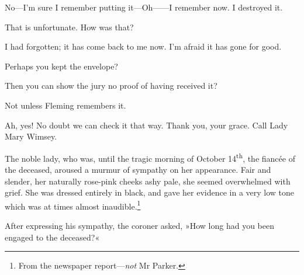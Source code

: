 \begin{dialogue}
 No—I'm sure I remember putting it—Oh——I remember now. I destroyed it.

 That is unfortunate. How was that?

 I had forgotten; it has come back to me now. I'm afraid it has gone for good.

 Perhaps you kept the envelope?

 

 Then you can show the jury no proof of having received it?

 Not unless Fleming remembers it.

 Ah, yes! No doubt we can check it that way. Thank you, your grace. Call Lady Mary Wimsey.
\end{dialogue}

The noble lady, who was, until the tragic morning of October 14\textsuperscript{th}, the fiancée of the deceased, aroused a murmur of sympathy on her appearance. Fair and slender, her naturally rose-pink cheeks ashy pale, she seemed overwhelmed with grief. She was dressed entirely in black, and gave her evidence in a very low tone which was at times almost inaudible.\footnote{From the newspaper report—\textit{not} Mr Parker.}

After expressing his sympathy, the coroner asked, »How long had you been engaged to the deceased?«


